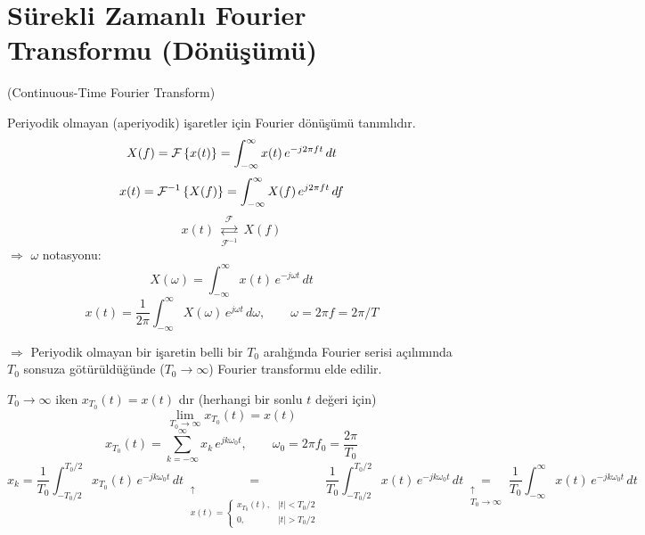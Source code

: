 \documentclass[11pt,a4paper]{article}
\begin{document}

\section{Sürekli Zamanlı Fourier Transformu (Dönüşümü)}
(Continuous-Time Fourier Transform)

Periyodik olmayan (aperiyodik) işaretler için Fourier dönüşümü tanımlıdır.
\[ X(f)=\mathcal{F}\left\{x(t)\right\}=\int_{-\infty}^{\infty} x(t)\,e^{-j2\pi ft}\,dt \]
\[ x(t)=\mathcal{F}^{-1}\left\{X(f)\right\}=\int_{-\infty}^{\infty} X(f)\,e^{j2\pi ft}\,df \]
\[ x(t)\ \underset{\mathcal{F}^{-1}}{\overset{\mathcal{F}}{\rightleftarrows}}\ X(f) \]
$\Rightarrow$ $\omega$ notasyonu:
\[ X(\omega)=\int_{-\infty}^{\infty} x(t)\,e^{-j\omega t}\,dt \]
\[ x(t)=\frac{1}{2\pi}\int_{-\infty}^{\infty} X(\omega)\,e^{j\omega t}\,d\omega, \qquad \omega=2\pi f=2\pi/T \]

$\Rightarrow$ Periyodik olmayan bir işaretin belli bir $T_0$ aralığında Fourier serisi açılımında $T_0$ sonsuza götürüldüğünde ($T_0\to\infty$) Fourier transformu elde edilir.
\begin{center}

\end{center}
$T_0\to\infty$ iken $x_{T_0}(t)=x(t)$ dır (herhangi bir sonlu $t$ değeri için)
\[ \lim_{T_0\to\infty} x_{T_0}(t)=x(t) \]
\[ x_{T_0}(t)=\sum_{k=-\infty}^{\infty} x_k\,e^{jk\omega_0 t}, \qquad \omega_0=2\pi f_0=\frac{2\pi}{T_0} \]
\[ x_k=\frac{1}{T_0}\int_{-T_0/2}^{T_0/2} x_{T_0}(t)\,e^{-jk\omega_0 t}\,dt
\underset{\substack{\uparrow\\ x(t)=\left\{\begin{smallmatrix} x_{T_0}(t), & |t|<T_0/2\\ 0, & |t|>T_0/2\end{smallmatrix}\right.}}{=}
\frac{1}{T_0}\int_{-T_0/2}^{T_0/2} x(t)\,e^{-jk\omega_0 t}\,dt
\underset{\substack{\uparrow\\ T_0\to\infty}}{=}
\frac{1}{T_0}\int_{-\infty}^{\infty} x(t)\,e^{-jk\omega_0 t}\,dt \]
\end{document}

